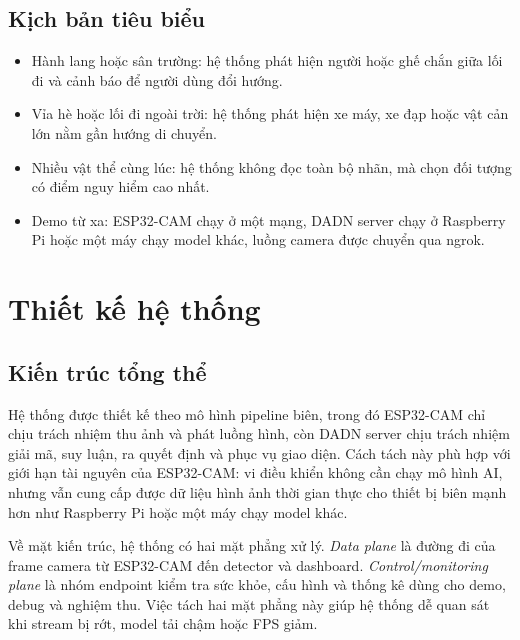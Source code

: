 \documentclass[oneside,final]{hcmut-report}
\begin{document}
\subsection{Kịch bản tiêu biểu}
\begin{itemize}
  \item Hành lang hoặc sân trường: hệ thống phát hiện người hoặc ghế chắn giữa lối đi và cảnh báo để người dùng đổi hướng.
  \item Vỉa hè hoặc lối đi ngoài trời: hệ thống phát hiện xe máy, xe đạp hoặc vật cản lớn nằm gần hướng di chuyển.
  \item Nhiều vật thể cùng lúc: hệ thống không đọc toàn bộ nhãn, mà chọn đối tượng có điểm nguy hiểm cao nhất.
  \item Demo từ xa: ESP32-CAM chạy ở một mạng, DADN server chạy ở Raspberry Pi hoặc một máy chạy model khác, luồng camera được chuyển qua ngrok.
\end{itemize}

\section{Thiết kế hệ thống}

\subsection{Kiến trúc tổng thể}
Hệ thống được thiết kế theo mô hình pipeline biên, trong đó ESP32-CAM chỉ chịu trách nhiệm thu ảnh và phát luồng hình, còn DADN server chịu trách nhiệm giải mã, suy luận, ra quyết định và phục vụ giao diện. Cách tách này phù hợp với giới hạn tài nguyên của ESP32-CAM: vi điều khiển không cần chạy mô hình AI, nhưng vẫn cung cấp được dữ liệu hình ảnh thời gian thực cho thiết bị biên mạnh hơn như Raspberry Pi hoặc một máy chạy model khác.

Về mặt kiến trúc, hệ thống có hai mặt phẳng xử lý. \textit{Data plane} là đường đi của frame camera từ ESP32-CAM đến detector và dashboard. \textit{Control/monitoring plane} là nhóm endpoint kiểm tra sức khỏe, cấu hình và thống kê dùng cho demo, debug và nghiệm thu. Việc tách hai mặt phẳng này giúp hệ thống dễ quan sát khi stream bị rớt, model tải chậm hoặc FPS giảm.
\end{document}
